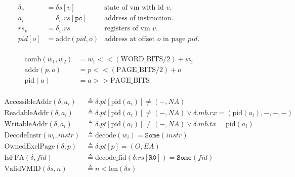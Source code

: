 \documentclass[a4paper]{article}
\newcommand*{\defined}{\triangleq}
\newcommand*{\PPBITS}{\text{PAGE\_BITS}}
\newcommand*{\PWBITS}{\text{WORD\_BITS}}
\newcommand*{\DN}[1]{\mathtt{Done} \; {#1}}
\newcommand*{\NXT}[1]{\mathtt{Next} \; {#1}}
\newcommand*{\decode}{\text{decode}}
\newcommand*{\pid}{\text{pid}}
\newcommand{\SOME}{\mathtt{Some}}
\begin{document}
\newcommand{\reg}[1]{\texttt{{#1}}}
\newcommand{\ta}[1]{\text{to\_addr}({#1})}
\newcommand{\tw}[1]{\text{to\_word}({#1})}
\newcommand{\tv}[1]{\text{to\_vmid}({#1})}
\newcommand{\DNNXT}[1]{\DN{\NXT{ {#1} }}}
\begin{figure}[!htb]
    \begin{align*}
      \delta_v&=\delta s[v] & \text{state of vm with id }v.\\
      a_i&=\delta_v.rs[\mathtt{pc}] & \text{address of instruction}. \\
      rs_v&=\delta_v.rs & \text{registers of vm }v.\\
      pid[o] &=\text{addr}(pid,o) & \text{address at offset }o \text{ in page }pid.
    \end{align*}
    \\
    \begin{align*}
          \text{comb}(w_{1},w_{2})&=w_{1}<<(\PWBITS/2)+w_{2}\\
    \text{addr}(p,o)&=p<<(\PPBITS/2)+o \\
    \pid(a) &= a >> \PPBITS
      \end{align*}
    \\
    \begin{align*}
      \text{AccessibleAddr}(\delta,a_i) &\defined \delta.pt[\pid(a_i)]\ne(-,NA) \\
      \text{ReadableAddr}(\delta,a_i) &\defined \delta.pt[\pid(a_i)]\ne(-,NA) \lor \delta.mb.rx=(\pid(a_i),-,-,-) \\
      \text{WritableAddr}(\delta,a_i) &\defined \delta.pt[\pid(a_i)]\ne(-,NA) \lor \delta.mb.tx=\pid(a_i) \\
      \text{DecodeInstr}(w_i,instr) &\defined \decode(w_i)=\SOME(instr)\\
      \text{OwnedExclPage}(\delta,p) & \defined \delta.pt[p]=(O,EA)\\
      \text{IsFFA}(\delta, fid) & \defined \text{decode\_fid}(\delta.rs[\reg{R0}])=\SOME(fid)\\
      \text{ValidVMID}(\delta s,n) &\defined n<\text{len}(\delta s)
      \end{align*}
  \end{figure}
\end{document}
